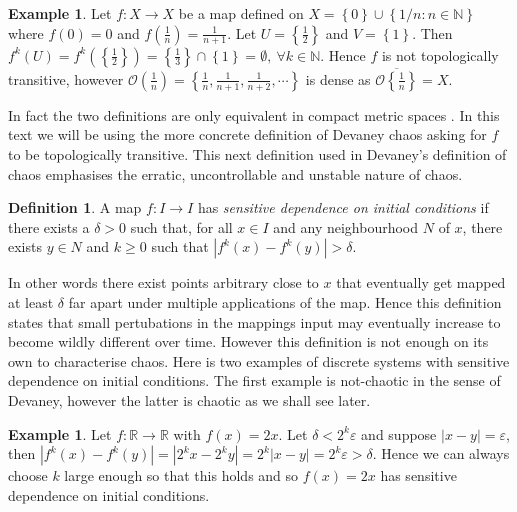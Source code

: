 \documentclass[11pt,a4paper,oneside]{memoir}
\theoremstyle{plain}
\theoremstyle{definition}
\newtheorem{defn}[thm]{Definition}
\newtheorem{exmp}[thm]{Example}
\begin{document}
\begin{exmp}
    Let $f: X \to X$ be a map defined on $X = \left\lbrace 0 \right\rbrace \cup \left\lbrace 1/n : n \in \mathbb{N} \right\rbrace$ where $f(0) = 0$ and $f(\frac{1}{n}) = \frac{1}{n+1}$. Let $U = \left\lbrace \frac{1}{2} \right\rbrace$ and $V = \left\lbrace 1 \right\rbrace$. Then $f^k(U) = f^k(\left\lbrace \frac{1}{2} \right\rbrace) = \left\lbrace \frac{1}{3} \right\rbrace \cap \left\lbrace 1 \right\rbrace = \emptyset, \ \forall k \in \mathbb{N}$. Hence $f$ is not topologically transitive, however $\mathcal{O}(\frac{1}{n}) = \left\lbrace \frac{1}{n}, \frac{1}{n+1}, \frac{1}{n+2}, \cdots \right\rbrace$ is dense as $\overline{\mathcal{O}\left\lbrace\frac{1}{n}\right\rbrace} = X$.
\end{exmp}

In fact the two definitions are only equivalent in compact metric spaces \cite[Section 2]{sergiy-lubomir}. In this text we will be using the more concrete definition of Devaney chaos asking for $f$ to be topologically transitive. This next definition used in Devaney's definition of chaos emphasises the erratic, uncontrollable and unstable nature of chaos.

\begin{defn}\label{defn:sdic}
    A map $f: I \to I$ has \emph{sensitive dependence on initial conditions} if there exists a $\delta > 0$ such that, for all $x \in I$ and any neighbourhood $N$ of $x$, there exists $y \in N$ and $k \geq 0$ such that $\left\lvert f^k(x) - f^k(y) \right\rvert > \delta$.
\end{defn}

In other words there exist points arbitrary close to $x$ that eventually get mapped at least $\delta$ far apart under multiple applications of the map. Hence this definition states that small pertubations in the mappings input may eventually increase to become wildly different over time. However this definition is not enough on its own to characterise chaos. Here is two examples of discrete systems with sensitive dependence on initial conditions. The first example is not-chaotic in the sense of Devaney, however the latter is chaotic as we shall see later.

\begin{exmp} \label{exmp:2x}
    Let $f: \mathbb{R} \to \mathbb{R}$ with $f(x) = 2x$. Let $\delta < 2^k \varepsilon$ and suppose $|x - y| = \varepsilon$, then $\left\lvert f^k(x) - f^k(y) \right\rvert = \left\lvert 2^k x - 2^k y \right\rvert = 2^k \left\lvert x - y \right\rvert = 2^k \varepsilon > \delta$. Hence we can always choose $k$ large enough so that this holds and so $f(x) = 2x$ has sensitive dependence on initial conditions.
\end{exmp}
\end{document}
